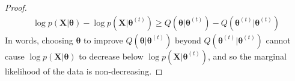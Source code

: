 \documentclass[8pt,landscape]{article}
\begin{document}
\begin{multicols}{3}
\begin{proof}
	\begin{align*}
		\log p(\mathbf{X}|\boldsymbol\theta) - \log p(\mathbf{X}|\boldsymbol\theta^{(t)})
		\ge Q(\boldsymbol\theta|\boldsymbol\theta^{(t)}) - Q(\boldsymbol\theta^{(t)}|\boldsymbol\theta^{(t)})
	\end{align*}
	In words, choosing $\boldsymbol\theta$ to improve $Q(\boldsymbol\theta|\boldsymbol\theta^{(t)})$ beyond $Q(\boldsymbol\theta^{(t)}|\boldsymbol\theta^{(t)})$ cannot cause $\log p(\mathbf{X}|\boldsymbol\theta)$ to decrease below $\log p(\mathbf{X}|\boldsymbol\theta^{(t)})$, and so the marginal likelihood of the data is non-decreasing.
\end{proof}

\end{multicols}
\end{document}
